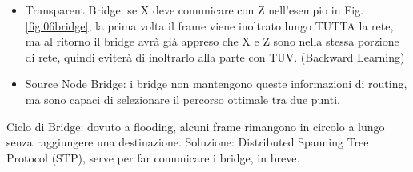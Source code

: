 \begin{itemize}
    \item Transparent Bridge: se X deve comunicare con Z nell'esempio in Fig. \ref{fig:06bridge}, la prima volta il frame viene inoltrato lungo TUTTA la rete, ma al ritorno il bridge avrà già appreso che X e Z sono nella stessa porzione di rete, quindi eviterà di inoltrarlo alla parte con TUV. (Backward Learning)
    \item Source Node Bridge: i bridge non mantengono queste informazioni di routing, ma sono capaci di selezionare il percorso ottimale tra due punti.
\end{itemize}
\noindent Ciclo di Bridge: dovuto a flooding, alcuni frame rimangono in circolo a lungo senza raggiungere una destinazione. Soluzione: Distributed Spanning Tree Protocol (STP), serve per far comunicare i bridge, in breve.\\

